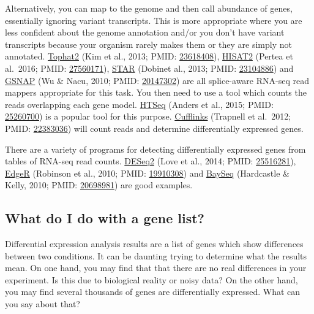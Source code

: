 \documentclass[11pt]{article}
\begin{document}
Alternatively, you can map to the genome and then call abundance of
genes, essentially ignoring variant transcripts. This is more
appropriate where you are less confident about the genome annotation
and/or you don't have variant transcripts because your organism rarely
makes them or they are simply not annotated.
\href{https://ccb.jhu.edu/software/tophat/index.shtml}{Tophat2} (Kim et
al., 2013; PMID:
\href{https://www.ncbi.nlm.nih.gov/pubmed/23618408}{23618408}),
\href{https://ccb.jhu.edu/software/hisat2/index.shtml}{HISAT2} (Pertea
et al.~2016; PMID:
\href{https://www.ncbi.nlm.nih.gov/pubmed/27560171}{27560171}),
\href{https://github.com/alexdobin/STAR}{STAR} (Dobinet al., 2013; PMID:
\href{https://www.ncbi.nlm.nih.gov/pubmed/23104886}{23104886}) and
\href{http://research-pub.gene.com/gmap/}{GSNAP} (Wu \& Nacu, 2010;
PMID: \href{https://www.ncbi.nlm.nih.gov/pubmed/20147302}{20147302}) are
all splice-aware RNA-seq read mappers appropriate for this task. You
then need to use a tool which counts the reads overlapping each gene
model. \href{https://htseq.readthedocs.io/en/release_0.10.0/}{HTSeq}
(Anders et al., 2015; PMID:
\href{https://www.ncbi.nlm.nih.gov/pubmed/25260700}{25260700}) is a
popular tool for this purpose.
\href{https://github.com/cole-trapnell-lab/cufflinks}{Cufflinks}
(Trapnell et al.~2012; PMID:
\href{https://www.ncbi.nlm.nih.gov/pubmed/22383036}{22383036}) will
count reads and determine differentially expressed genes.

There are a variety of programs for detecting differentially expressed
genes from tables of RNA-seq read counts.
\href{https://bioconductor.org/packages/release/bioc/html/DESeq2.html}{DESeq2}
(Love et al., 2014; PMID:
\href{https://www.ncbi.nlm.nih.gov/pubmed/25516281}{25516281}),
\href{https://bioconductor.org/packages/release/bioc/html/edgeR.html}{EdgeR}
(Robinson et al., 2010; PMID:
\href{https://www.ncbi.nlm.nih.gov/pubmed/19910308}{19910308}) and
\href{http://bioconductor.org/packages/release/bioc/html/baySeq.html}{BaySeq}
(Hardcastle \& Kelly, 2010; PMID:
\href{https://www.ncbi.nlm.nih.gov/pubmed/20698981}{20698981}) are good
examples.

\hypertarget{what-do-i-do-with-a-gene-list}{%
\subsection{What do I do with a gene
list?}\label{what-do-i-do-with-a-gene-list}}

Differential expression analysis results are a list of genes which show
differences between two conditions. It can be daunting trying to
determine what the results mean. On one hand, you may find that that
there are no real differences in your experiment. Is this due to
biological reality or noisy data? On the other hand, you may find
several thousands of genes are differentially expressed. What can you
say about that?
\end{document}
